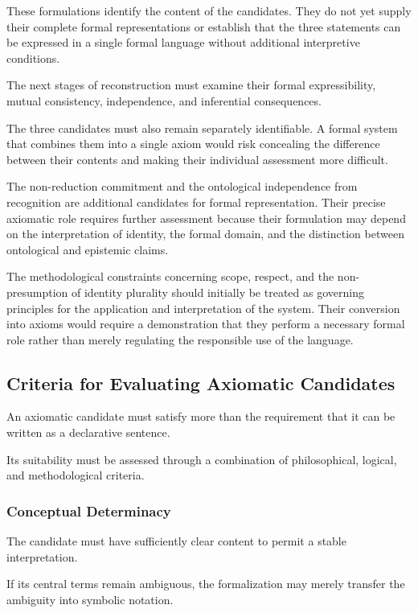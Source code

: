 These formulations identify the content of the
candidates. They do not yet supply their complete
formal representations or establish that the
three statements can be expressed in a single
formal language without additional interpretive
conditions.

The next stages of reconstruction must examine
their formal expressibility, mutual consistency,
independence, and inferential consequences.

The three candidates must also remain separately
identifiable. A formal system that combines them
into a single axiom would risk concealing the
difference between their contents and making
their individual assessment more difficult.

The non-reduction commitment and the ontological
independence from recognition are additional
candidates for formal representation. Their
precise axiomatic role requires further assessment
because their formulation may depend on the
interpretation of identity, the formal domain,
and the distinction between ontological and
epistemic claims.

The methodological constraints concerning scope,
respect, and the non-presumption of identity
plurality should initially be treated as governing
principles for the application and interpretation
of the system. Their conversion into axioms
would require a demonstration that they perform
a necessary formal role rather than merely
regulating the responsible use of the language.

\subsection{Criteria for Evaluating Axiomatic Candidates}

An axiomatic candidate must satisfy more than
the requirement that it can be written as a
declarative sentence.

Its suitability must be assessed through a
combination of philosophical, logical, and
methodological criteria.

\subsubsection{Conceptual Determinacy}

The candidate must have sufficiently clear
content to permit a stable interpretation.

If its central terms remain ambiguous, the
formalization may merely transfer the ambiguity
into symbolic notation.

